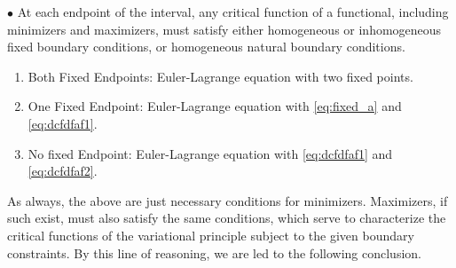 \documentclass{article}
\begin{document}
$\bullet$ 
At each endpoint of the interval, any critical function of a functional, including minimizers and maximizers, must satisfy either homogeneous or inhomogeneous fixed boundary conditions, or homogeneous natural boundary conditions.
\begin{enumerate}
    \item Both Fixed  Endpoints: Euler-Lagrange equation with two fixed points.
    \item One Fixed Endpoint: Euler-Lagrange equation  with \cref{eq:fixed_a} and \cref{eq:dcfdfaf1}.
    \item No fixed Endpoint: Euler-Lagrange equation  with \cref{eq:dcfdfaf1} and \cref{eq:dcfdfaf2}.
\end{enumerate}
\begin{rema}
As always, the above are just necessary conditions for minimizers. Maximizers, if such exist, must also satisfy the same conditions, which serve to characterize the critical functions of the variational principle subject to the given boundary constraints. By this line of reasoning, we are led to the following conclusion.
\end{rema}
\end{document}
